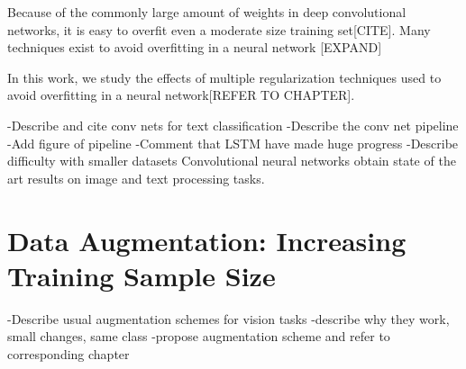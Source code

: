 Because of the commonly large amount of weights in deep convolutional networks, it is easy to overfit even a moderate size training set[CITE].
Many techniques exist to avoid overfitting in a neural network
[EXPAND]

In this work, we study the effects of multiple regularization techniques used to avoid overfitting in a neural network[REFER TO CHAPTER].


-Describe and cite conv nets for text classification
-Describe the conv net pipeline
-Add figure of pipeline
-Comment that LSTM have made huge progress
-Describe difficulty with smaller datasets
Convolutional neural networks obtain state of the art results on image and text processing tasks.


\section{Data Augmentation: Increasing Training Sample Size}
-Describe usual augmentation schemes for vision tasks
-describe why they work, small changes, same class
-propose augmentation scheme and refer to corresponding chapter
